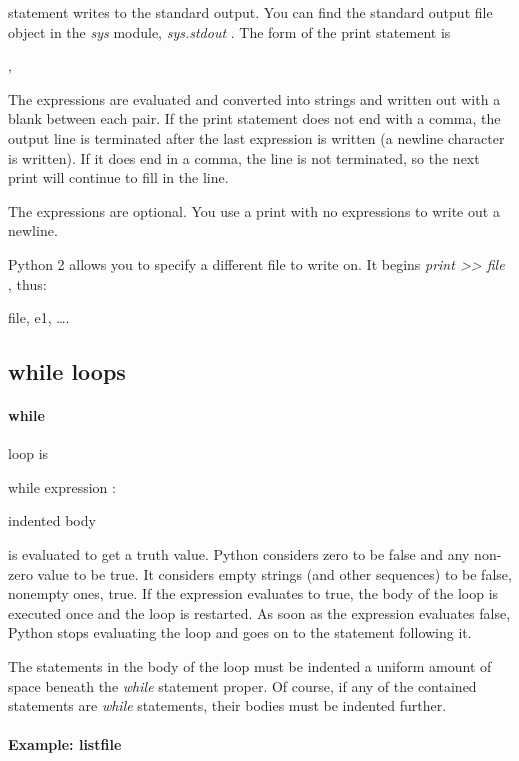  statement writes
to the standard output. You can find the standard output file object in
the \emph{sys} module, \emph{sys.stdout} . The form of the print
statement is



 ,

The expressions are evaluated and
converted into strings and written out with a blank between each pair.
If the print statement does not end with a comma, the output line is
terminated after the last expression is written (a newline character is
written). If it does end in a comma, the line is not terminated, so the
next print will continue to fill in the line.

The expressions are optional. You
use a print with no expressions to write out a newline.

Python 2 allows you to specify a
different file to write on. It begins \emph{print
\textgreater{}\textgreater{} file} , thus:


file, e1, \ldots{}.

\subsection{while loops}
\label{while-loops}

\paragraph{while}
\label{while-statement}

 loop is

while expression :

 indented body

 is evaluated
to get a truth value. Python considers zero to be false and any non-zero
value to be true. It considers empty strings (and other sequences) to be
false, nonempty ones, true. If the expression evaluates to true, the
body of the loop is executed once and the loop is restarted. As soon as
the expression evaluates false, Python stops evaluating the loop and
goes on to the statement following it.

The statements in the body of the
loop must be indented a uniform amount of space beneath the \emph{while}
statement proper. Of course, if any of the contained statements are
\emph{while} statements, their bodies must be indented further.

\paragraph{Example: listfile}
\label{example-listfile}

